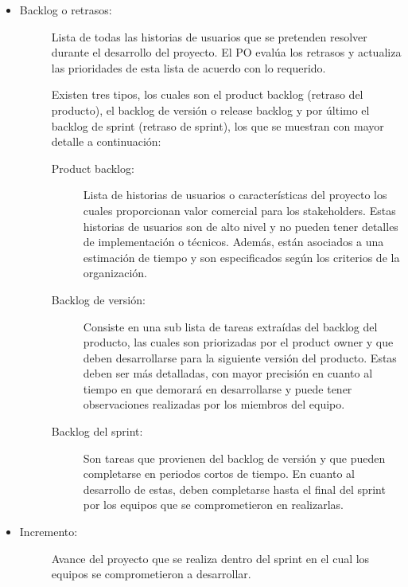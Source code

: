 \begin{itemize}
    \item   \begin{description}

                \item[Backlog o retrasos: ] Lista de todas las historias de usuarios que se pretenden resolver durante el desarrollo del proyecto. El PO evalúa los retrasos y actualiza las prioridades de esta lista de acuerdo con lo requerido.
                
                Existen tres tipos, los cuales son el product backlog (retraso del producto), el backlog de versión o release backlog y por último el backlog de sprint (retraso de sprint), los que se muestran con mayor detalle a continuación:
                
                \begin{description}
                    \item[Product backlog: ] Lista de historias de usuarios o características del proyecto los cuales proporcionan valor comercial para los stakeholders. Estas historias de usuarios son de alto nivel y no pueden tener detalles de implementación o técnicos. Además, están asociados a una estimación de tiempo y son especificados según los criterios de la organización.
                        
                    \item[Backlog de versión: ]  Consiste en una sub lista de tareas extraídas del backlog del producto, las cuales son priorizadas por el product owner y que deben desarrollarse para la siguiente versión del producto. Estas deben ser más detalladas, con mayor precisión en cuanto al tiempo en que demorará en desarrollarse y puede tener observaciones realizadas por los miembros del equipo.
                        
                    \item[Backlog del sprint: ] Son tareas que provienen del backlog de versión y que pueden completarse en periodos cortos de tiempo. En cuanto al desarrollo de estas, deben completarse hasta el final del sprint por los equipos que se comprometieron en realizarlas.
                \end{description} 
            \end{description}    

    \item   \begin{description}
                \item[Incremento:] Avance del proyecto que se realiza dentro del sprint en el cual los equipos se comprometieron a desarrollar.
            \end{description}
    

\end{itemize}
